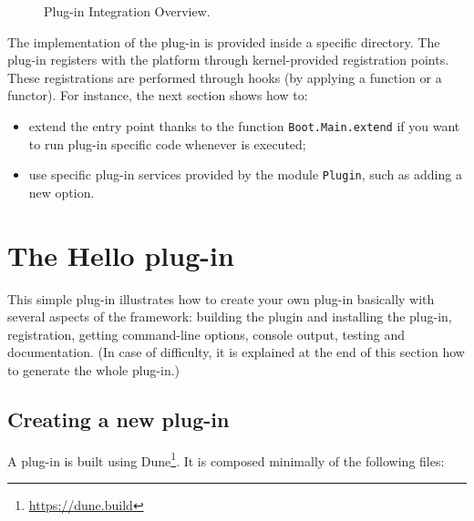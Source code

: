 \begin{figure}[ht]
\begin{center}
\end{center}
\caption{Plug-in Integration Overview.}\label{fig:overview}
\end{figure}

The implementation of the plug-in is provided inside a specific directory.
The plug-in registers with the \framac platform through
kernel-provided registration points. These
registrations are performed  through hooks (by applying
a function or a functor). For instance,
the next section shows how to:
\begin{itemize}
\item extend the \framac entry point thanks to the function
  \texttt{Boot.Main.extend} if you want to run
  plug-in specific code whenever \framac is executed;
\item use specific plug-in services provided by the module
  \texttt{Plugin}, such as adding a new \framac option.
\end{itemize}

\section{The Hello plug-in}\label{tut2:hello}

This simple plug-in illustrates how to create your own plug-in basically with
several aspects of the \framac framework: building the plugin and installing the
plug-in, registration, getting command-line options, console output, testing and
documentation. (In case of difficulty, it is explained at the end of this
section how to generate the whole plug-in.)

\subsection{Creating a new plug-in}\label{tut2:basic}

A plug-in is built using Dune\footnote{\url{https://dune.build}}. It is composed
minimally of the following files:


